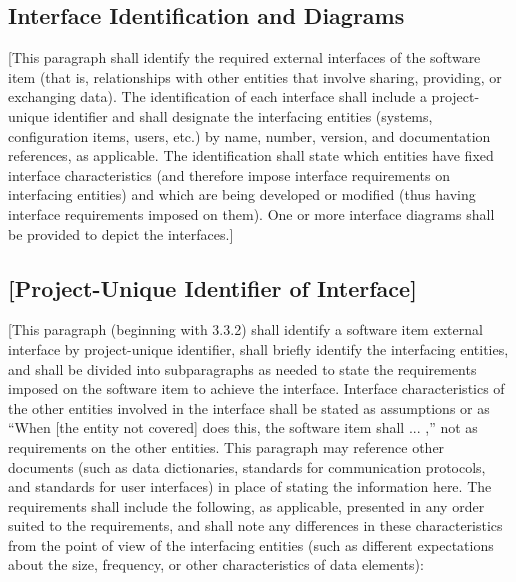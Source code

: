 \subsection{Interface Identification and Diagrams\label{ref-010}}

[This paragraph shall identify the required external interfaces of the software item (that is, relationships with other entities that involve sharing, providing, or exchanging data). The identification of each interface shall include a project-unique identifier and shall designate the interfacing entities (systems, configuration items, users, etc.) by name, number, version, and documentation references, as applicable. The identification shall state which entities have fixed interface characteristics (and therefore impose interface requirements on interfacing entities) and which are being developed or modified (thus having interface requirements imposed on them). One or more interface diagrams shall be provided to depict the interfaces.]

\subsection{[Project-Unique Identifier of Interface]\label{ref-011}}

[This paragraph (beginning with 3.3.2) shall identify a software item external interface by project-unique identifier, shall briefly identify the interfacing entities, and shall be divided into subparagraphs as needed to state the requirements imposed on the software item to achieve the interface. Interface characteristics of the other entities involved in the interface shall be stated as assumptions or as ``When [the entity not covered] does this, the software item shall ... ,'' not as requirements on the other entities. This paragraph may reference other documents (such as data dictionaries, standards for communication protocols, and standards for user interfaces) in place of stating the information here. The requirements shall include the following, as applicable, presented in any order suited to the requirements, and shall note any differences in these characteristics from the point of view of the interfacing entities (such as different expectations about the size, frequency, or other characteristics of data elements):

